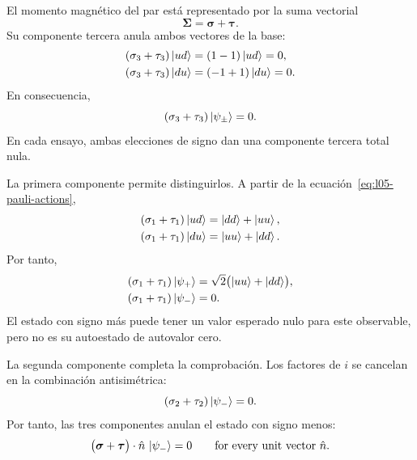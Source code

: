 El momento magnético del par está representado por la suma vectorial
\begin{equation}
  \boldsymbol{\Sigma}
  =
  \boldsymbol{\sigma}+\boldsymbol{\tau}.
\end{equation}
Su componente tercera anula ambos vectores de la base:
\begin{align}
  (\sigma_3+\tau_3)\left\lvert ud\right\rangle
  &=(1-1)\left\lvert ud\right\rangle=0,\nonumber\\
  (\sigma_3+\tau_3)\left\lvert du\right\rangle
  &=(-1+1)\left\lvert du\right\rangle=0.
\end{align}
En consecuencia,
\begin{equation}
  (\sigma_3+\tau_3)\left\lvert\psi_\pm\right\rangle=0.
\end{equation}
En cada ensayo, ambas elecciones de signo dan una componente tercera total nula.

La primera componente permite distinguirlos. A partir de la ecuación~\eqref{eq:l05-pauli-actions},
\begin{align}
  (\sigma_1+\tau_1)\left\lvert ud\right\rangle
  &=\left\lvert dd\right\rangle+\left\lvert uu\right\rangle,\nonumber\\
  (\sigma_1+\tau_1)\left\lvert du\right\rangle
  &=\left\lvert uu\right\rangle+\left\lvert dd\right\rangle.
\end{align}
Por tanto,
\begin{align}
  (\sigma_1+\tau_1)\left\lvert\psi_+\right\rangle
  &=
  \sqrt2\bigl(\left\lvert uu\right\rangle+\left\lvert dd\right\rangle\bigr),\nonumber\\
  (\sigma_1+\tau_1)\left\lvert\psi_-\right\rangle
  &=0.
  \label{eq:l05-total-x}
\end{align}
El estado con signo más puede tener un valor esperado nulo para este observable, pero no es su autoestado de autovalor cero.

\begin{classroomqa}
\end{classroomqa}

La segunda componente completa la comprobación. Los factores de \(i\) se cancelan en la combinación antisimétrica:
\begin{equation}
  (\sigma_2+\tau_2)\left\lvert\psi_-\right\rangle=0.
\end{equation}
Por tanto, las tres componentes anulan el estado con signo menos:
\begin{equation}
  \bigl(\boldsymbol{\sigma}+\boldsymbol{\tau}\bigr)
  \cdot\hat n\,\left\lvert\psi_-\right\rangle=0
  \qquad\text{for every unit vector }\hat n.
  \label{eq:l05-singlet-any-axis}
\end{equation}

